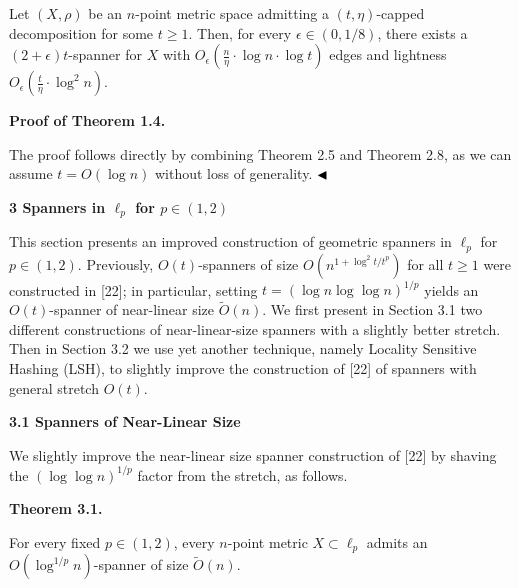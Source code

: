 \documentclass[10pt,a4paper]{amsart}
\begin{document}
Let $(X,\rho)$ be an $n$-point metric space admitting a $(t,\eta)$-capped decomposition for some $t\geq 1$. Then, for every $\epsilon\in(0,1/8)$, there exists a $(2+\epsilon)t$-spanner for $X$ with $O_{\epsilon}(\frac{n}{\eta}\cdot\log n\cdot\log t)$ edges and lightness $O_{\epsilon}(\frac{t}{\eta}\cdot\log^{2}n)$.
\par
\par
\par
\par\medskip\noindent\textbf{Proof of Theorem 1.4.}\par
The proof follows directly by combining Theorem 2.5 and Theorem 2.8, as we can assume $t=O(\log{n})$ without loss of generality. $\hfill\blacktriangleleft$
\par
\par
\par
\par
\par\medskip\noindent\textbf{3 Spanners in $\ell_{p}$ for $p\in(1,2)$}\par
This section presents an improved construction of geometric spanners in $\ell_{p}$ for $p\in(1,2)$. Previously, $O(t)$-spanners of size $O(n^{1+\log^{2}{t}/t^{p}})$ for all $t\geq 1$ were constructed in [22]; in particular, setting $t=(\log{n}\log{\log{n}})^{1/p}$ yields an $O(t)$-spanner of near-linear size $\tilde{O}(n)$. We first present in Section 3.1 two different constructions of near-linear-size spanners with a slightly better stretch. Then in Section 3.2 we use yet another technique, namely Locality Sensitive Hashing (LSH), to slightly improve the construction of [22] of spanners with general stretch $O(t)$.
\par
\par
\par\medskip\noindent\textbf{3.1 Spanners of Near-Linear Size}\par
We slightly improve the near-linear size spanner construction of [22] by shaving the $(\log\log{n})^{1/p}$ factor from the stretch, as follows.
\par
\par
\par\medskip\noindent\textbf{Theorem 3.1.}\par
For every fixed $p\in(1,2)$, every $n$-point metric $X\subset\ell_{p}$ admits an $O(\log^{1/p}{n})$-spanner of size $\tilde{O}(n)$.
\par
\par
\par
\end{document}

